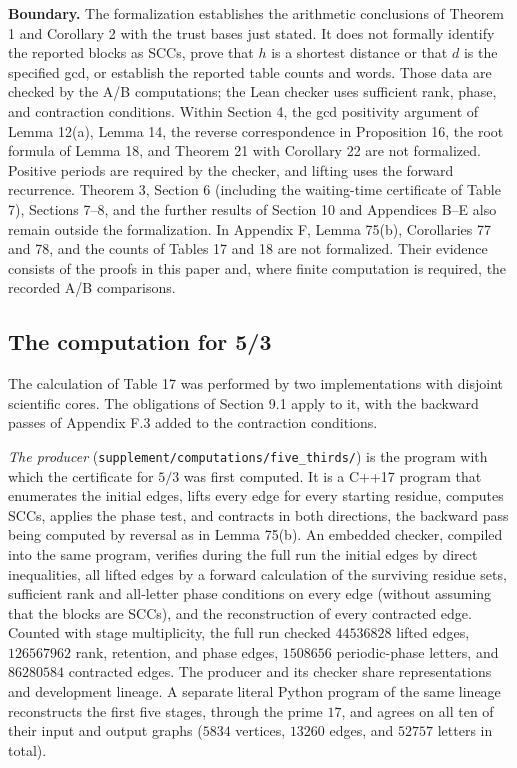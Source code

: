 \documentclass[11pt,reqno]{amsart}
\theoremstyle{definition}
\theoremstyle{remark}
\begin{document}
\textbf{Boundary.} The formalization establishes the arithmetic conclusions
of Theorem 1 and Corollary 2 with the trust bases just stated. It does
not formally identify the reported blocks as SCCs, prove that \(h\)
is a shortest distance or that \(d\) is the specified gcd, or establish
the reported table counts and words. Those data are checked by the
A/B computations; the Lean checker uses sufficient rank, phase, and
contraction conditions. Within Section 4, the gcd positivity argument
of Lemma 12(a), Lemma 14, the reverse correspondence in Proposition 16,
the root formula of Lemma 18, and Theorem 21 with Corollary 22 are not
formalized. Positive periods are required by the checker, and lifting
uses the forward recurrence. Theorem 3, Section 6 (including the
waiting-time certificate of Table 7), Sections 7--8, and the further
results of Section 10 and Appendices B--E also remain outside the
formalization. In Appendix F, Lemma 75(b), Corollaries 77 and 78, and the
counts of Tables 17 and 18 are not formalized. Their evidence consists of the proofs in this paper and,
where finite computation is required, the recorded A/B comparisons.

\subsection{The computation for 5/3}\label{sec:9.5}

The calculation of Table 17 was performed by two implementations with
disjoint scientific cores. The obligations of Section 9.1 apply to it,
with the backward passes of Appendix F.3 added to the contraction
conditions.

\emph{The producer} (\nolinkurl{supplement/computations/five_thirds/}) is the
program with which the certificate for \(5/3\) was first computed. It is a
C++17 program that enumerates the initial edges, lifts every edge for
every starting residue, computes SCCs, applies the phase test, and
contracts in both directions, the backward pass being computed by
reversal as in Lemma 75(b). An embedded checker, compiled into the same
program, verifies during the full run the initial edges by direct
inequalities, all lifted edges by a forward calculation of the surviving
residue sets, sufficient rank and all-letter phase conditions on every
edge (without assuming that the blocks are SCCs), and the reconstruction
of every contracted edge. Counted with stage multiplicity, the full run
checked \(44536828\) lifted edges, \(126567962\) rank, retention, and
phase edges, \(1508656\) periodic-phase letters, and \(86280584\)
contracted edges. The producer and its checker share representations
and development lineage. A separate literal Python program of the same
lineage reconstructs the first five stages, through the prime \(17\),
and agrees on all ten of their input and output graphs (\(5834\)
vertices, \(13260\) edges, and \(52757\) letters in total).
\end{document}
